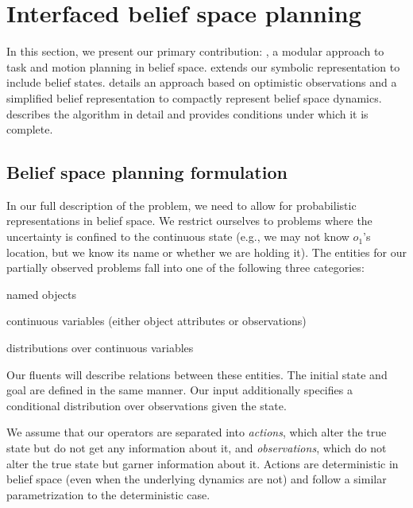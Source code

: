 \section{Interfaced belief space planning}
In this section, we present our primary contribution: \ibsp, a modular
approach to task and motion planning in belief
space.  extends our symbolic
representation to include belief states.  details
an approach based on optimistic observations and a simplified belief
representation to compactly represent belief space dynamics.
 describes the \ibsp{} algorithm in detail and provides conditions
under which it is complete.


\subsection{Belief space planning formulation}
\label{sec-bsp-formulation}
In our full description of the problem, we need to allow for
probabilistic representations in belief space. We restrict ourselves
to problems where the uncertainty is confined to the continuous state
(e.g., %
we may not know $o_1$'s location, but we know its name or whether
we are holding it). The entities for our partially observed problems
fall into one of the following three categories:
\begin{tightlist}
\item named objects
\item continuous variables (either object attributes or observations)
\item distributions over continuous variables
\end{tightlist}
Our fluents will describe relations between these entities. The
initial state and goal are defined in the same manner. Our input
additionally specifies a conditional distribution over observations
given the state.

We assume that our operators are separated into \emph{actions}, which
alter the true state but do not get any information about it, and
\emph{observations}, which do not alter the true state but garner
information about it. Actions are deterministic in belief space
(even when the underlying dynamics are not) and follow a similar
parametrization to the deterministic case.

